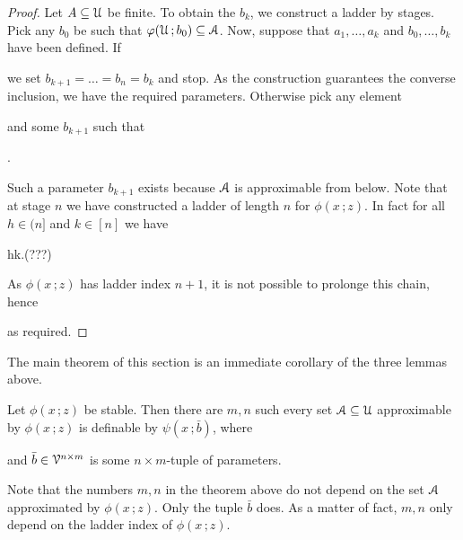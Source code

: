\documentclass[scombinatorics.tex]{subfiles}
\begin{document}
\begin{proof}
  Let $A\subseteq\EuScript U$ be finite.
  To obtain the $b_k$, we construct a ladder by stages.
  Pick any $b_0$ be such that $\varphi(\EuScript U\,;b_0)\subseteq\EuScript A$.
  Now, suppose that $a_1,\dots,a_k$ and $b_0,\dots,b_k$ have been defined.
  If 
  \\[-1ex]

  we set $b_{k+1}=\dots=b_n=b_k$ and stop.
  As the construction guarantees the converse inclusion, we have the required parameters.
  Otherwise pick any element


  and some $b_{k+1}$ such that

  .

  Such a parameter $b_{k+1}$ exists because $\EuScript A$ is approximable from below.
  Note that at stage $n$ we have constructed a ladder of length $n$ for $\phi(x\,;z)$.
  In fact for all $h\in(n]$ and $k\in[n]$ we have
  
  {\IFF}
  {h\le k.}\hfill (???)
  
  As $\phi(x\,;z)$ has ladder index $n+1$, it is not possible to prolonge this chain, hence


  as required.
\end{proof}
  
The main theorem of this section is an immediate corollary of the three lemmas above.

\begin{theorem}\label{thm_stable_definability}
  Let $\phi(x\,;z)$ be stable.
  Then there are $m, n$ such every set $\EuScript A\subseteq\EuScript U$ approximable by $\phi(x\,;z)$ is definable by $\psi(x\,;\bar b)$, where

  
  and $\bar b\in\EuScript V^{n\times m}$ is some $n{\times}m$-tuple of parameters.\QED
\end{theorem}

Note that the numbers $m,n$ in the theorem above do not depend on the set $\EuScript A$ approximated by $\phi(x\,;z)$.
Only the tuple $\bar b$ does.
As a matter of fact, $m,n$ only depend on the ladder index of $\phi(x\,;z)$.
\end{document}
